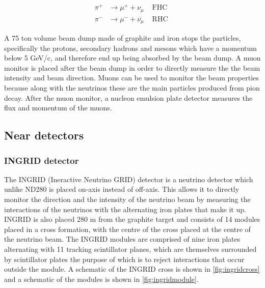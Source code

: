 \begin{equation}
\begin{array}{lll}
\pi^{+} & \longrightarrow \mu^{+}+\nu_{\mu} & \text { FHC } \\
\pi^{-} & \longrightarrow \mu^{-}+\overline{\nu_{\mu}} & \text { RHC }
\end{array}
\label{eq:nubeam}
\end{equation}

A 75 ton volume beam dump made of graphite and iron stops the particles, specifically the protons, secondary hadrons and mesons which have a momentum below 5 GeV/c, and therefore end up being absorbed by the beam dump. A muon monitor is placed after the beam dump in order to directly measure the the beam intensity and beam direction. Muons can be used to monitor the beam properties because along with the neutrinos these are the main particles produced from pion decay. After the muon monitor, a nucleon emulsion plate detector measures the flux and momentum of the muons. 

\subsection{Near detectors}

\subsubsection{INGRID detector}

The INGRID (Ineractive Neutrino GRID) detector is a neutrino detector which unlike ND280 is placed on-axis instead of off-axis. This allows it to directly monitor the direction and the intensity of the neutrino beam by measuring the interactions of the neutrinos with the alternating iron plates that make it up. INGRID is also placed 280 m from the graphite target and consists of 14 modules placed in a cross formation, with the centre of the cross placed at the centre of the neutrino beam. The INGRID modules are comprised of nine iron plates alternating with 11 tracking scintillator planes, which are themselves surrounded by scintillator plates the purpose of which is to reject interactions that occur outside the module. A schematic of the INGRID cross is shown in \ref{fig:ingridcross} and a schematic of the modules is shown in \ref{fig:ingridmodule}. 

